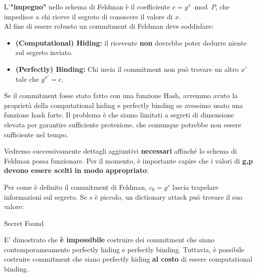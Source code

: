\begin{definition}\label{def:commitment}
L'\textbf{"impegno"} nello schema di Feldman è il coefficiente $c=g^x\bmod{P}$, che impedisce a chi riceve il segreto di conoscere il valore di $x$.\\
Al fine di essere robusto un commitment di Feldman deve soddisfare:
\begin{itemize}
    \item \textbf{(Computational) Hiding:} il ricevente \textbf{non} dovrebbe poter dedurre niente sul segreto inviato.
    \item \textbf{(Perfectly) Binding:} Chi invia il commitment non può trovare un altro $x'$ tale che $g^{x'}=c$.\footnotemark
\end{itemize}
\end{definition}
\begin{remark}
Se il commitment fosse stato fatto con una funzione Hash, avremmo avuto la proprietà della computational hiding e perfectly binding se avessimo usato una funzione hash forte. Il problema è che siamo limitati a segreti di dimensione elevata per garantire sufficiente protezione, che comunque potrebbe non essere sufficiente nel tempo.
\end{remark}
Vedremo successivamente dettagli aggiuntivi \textbf{necessari} affinché lo schema di Feldman possa funzionare. Per il momento, è importante capire che i valori di \textbf{g,p} \textbf{devono essere scelti in modo appropriato}:\\
\begin{remark}
Per come è definito il commitment di Feldman, $c_0=g^s$ lascia trapelare informazioni sul segreto. Se $s$ è piccolo, un dictionary attack può trovare il suo valore:
\begin{algorithmic}[1]
\State Secret Found
\EndIf
\EndFor
\end{algorithmic}
\end{remark}
\begin{remark}
E' dimostrato che \textbf{è impossibile} costruire dei commitment che siano contemporameamente perfectly hiding e perfectly binding. Tuttavia, è possibile costruire commitment che siano perfectly hiding \textbf{al costo} di essere computational binding.
\end{remark}
